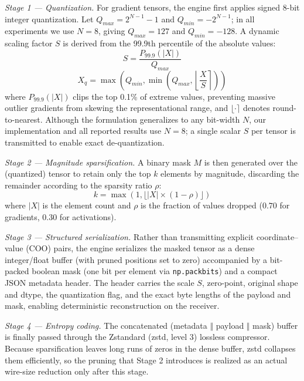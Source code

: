 \documentclass{ieeeaccess}
\begin{document}
\textit{Stage 1 --- Quantization.} For gradient tensors, the engine first applies signed 8-bit integer quantization. Let $Q_{max} = 2^{N-1} - 1$ and $Q_{min} = -2^{N-1}$; in all experiments we use $N = 8$, giving $Q_{max} = 127$ and $Q_{min} = -128$. A dynamic scaling factor $S$ is derived from the 99.9th percentile of the absolute values:
\begin{equation}
S = \frac{P_{99.9}(|X|)}{Q_{max}}
\end{equation}
\begin{equation}
X_q = \max \left( Q_{min}, \min \left( Q_{max}, \left\lfloor \frac{X}{S} \right\rceil \right) \right)
\end{equation}
where $P_{99.9}(|X|)$ clips the top 0.1\% of extreme values, preventing massive outlier gradients from skewing the representational range, and $\lfloor \cdot \rceil$ denotes round-to-nearest. Although the formulation generalizes to any bit-width $N$, our implementation and all reported results use $N = 8$; a single scalar $S$ per tensor is transmitted to enable exact de-quantization.

\textit{Stage 2 --- Magnitude sparsification.} A binary mask $M$ is then generated over the (quantized) tensor to retain only the top $k$ elements by magnitude, discarding the remainder according to the sparsity ratio $\rho$:
\begin{equation}
k = \max(1, \lfloor |X| \times (1 - \rho) \rfloor)
\end{equation}
where $|X|$ is the element count and $\rho$ is the fraction of values dropped ($0.70$ for gradients, $0.30$ for activations).

\textit{Stage 3 --- Structured serialization.} Rather than transmitting explicit coordinate--value (COO) pairs, the engine serializes the masked tensor as a dense integer/float buffer (with pruned positions set to zero) accompanied by a bit-packed boolean mask (one bit per element via \texttt{np.packbits}) and a compact JSON metadata header. The header carries the scale $S$, zero-point, original shape and dtype, the quantization flag, and the exact byte lengths of the payload and mask, enabling deterministic reconstruction on the receiver.

\textit{Stage 4 --- Entropy coding.} The concatenated (metadata $\Vert$ payload $\Vert$ mask) buffer is finally passed through the Zstandard (zstd, level 3) lossless compressor. Because sparsification leaves long runs of zeros in the dense buffer, zstd collapses them efficiently, so the pruning that Stage 2 introduces is realized as an actual wire-size reduction only after this stage.
\end{document}
